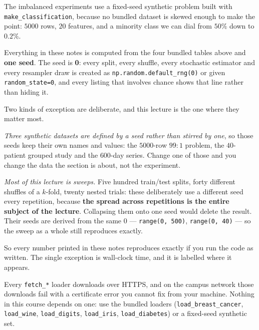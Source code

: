 \documentclass[11pt]{article}
\begin{document}
The imbalanced experiments use a fixed-seed synthetic problem built with
\texttt{make\_classification}, because no bundled dataset is skewed enough to
make the point: $5000$ rows, $20$ features, and a minority class we can dial
from $50\%$ down to $0.2\%$.

\begin{keyidea}
Everything in these notes is computed from the four bundled tables above and
\textbf{one seed}. The seed is \textbf{0}: every split, every shuffle, every
stochastic estimator and every resampler draw is created as
\texttt{np.random.default\_rng(0)} or given \texttt{random\_state=0}, and
every listing that involves chance shows that line rather than hiding it.

Two kinds of exception are deliberate, and this lecture is the one where they
matter most.

\emph{Three synthetic datasets are defined by a seed rather than stirred by
one}, so those seeds keep their own names and values: the $5000$-row $99{:}1$
problem, the $40$-patient grouped study and the $600$-day series. Change one
of those and you change the data the section is about, not the experiment.

\emph{Most of this lecture is sweeps.} Five hundred train/test splits, forty
different shuffles of a $k$-fold, twenty nested trials: these deliberately use
a different seed every repetition, because \textbf{the spread across
repetitions is the entire subject of the lecture}. Collapsing them onto one
seed would delete the result. Their seeds are derived from the same $0$
--- \texttt{range(0, 500)}, \texttt{range(0, 40)} --- so the sweep as a
whole still reproduces exactly.

So every number printed in these notes reproduces exactly if you run the code
as written. The single exception is wall-clock time, and it is labelled where
it appears.
\end{keyidea}

\begin{caution}
Every \texttt{fetch\_*} loader downloads over HTTPS, and on the campus network
those downloads fail with a certificate error you cannot fix from your machine.
Nothing in this course depends on one: use the bundled loaders
(\texttt{load\_breast\_cancer}, \texttt{load\_wine}, \texttt{load\_digits},
\texttt{load\_iris}, \texttt{load\_diabetes}) or a fixed-seed synthetic set.
\end{caution}
\end{document}
